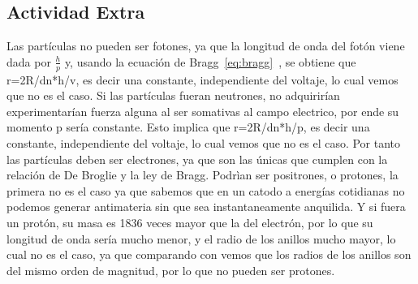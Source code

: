 \documentclass[a4paper,11pt]{article}
\begin{document}
\subsection{Actividad Extra}
Las partículas no pueden ser fotones, ya que la longitud de onda del fotón viene dada por $\frac{h}{p}$ y, usando la ecuación de Bragg~\eqref{eq:bragg}~\cite{bragg1915}, se obtiene
que r=2R/dn*h/v, es decir una constante, independiente del voltaje, lo cual vemos que no es el caso.
Si las partículas fueran neutrones, no adquirirían experimentarían fuerza alguna al ser somativas al campo electrico, por ende su momento p sería constante.
Esto implica que r=2R/dn*h/p, es decir una constante, independiente del voltaje, lo cual vemos que no es el caso.
Por tanto las partículas deben ser electrones, ya que son las únicas que cumplen con la relación de De Broglie y la ley de Bragg.
Podrìan ser positrones, o protones, la primera no es el caso ya que sabemos que en un catodo a energías cotidianas no podemos generar antimateria sin que sea instantaneamente anquilida.
Y si fuera un protón, su masa es 1836 veces mayor que la del electrón, por lo que su longitud de onda sería mucho menor, y el radio de los anillos mucho mayor, lo cual no es el caso,
ya que comparando con \cite{tonomura1989demonstration} vemos que los radios de los anillos son del mismo orden de magnitud, por lo que no pueden ser protones.


\end{document}
